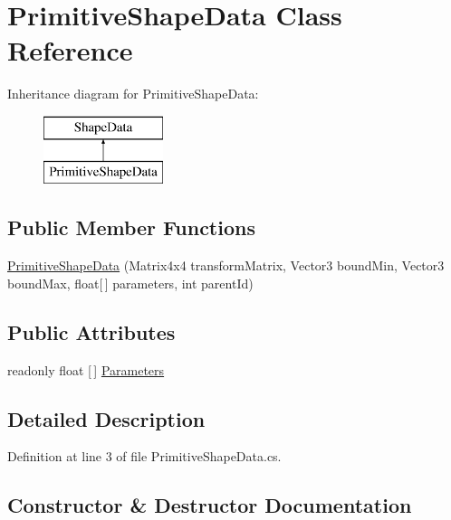 \hypertarget{class_primitive_shape_data}{}\section{Primitive\+Shape\+Data Class Reference}
\label{class_primitive_shape_data}
Inheritance diagram for Primitive\+Shape\+Data\+:\begin{figure}[H]
\begin{center}
\leavevmode
\includegraphics[height=2.000000cm]{class_primitive_shape_data}
\end{center}
\end{figure}
\subsection*{Public Member Functions}
\begin{DoxyCompactItemize}
\item 
\mbox{\hyperlink{class_primitive_shape_data_a9edf451a799cf5abe5079669cc0564b4}{Primitive\+Shape\+Data}} (Matrix4x4 transform\+Matrix, Vector3 bound\+Min, Vector3 bound\+Max, float\mbox{[}$\,$\mbox{]} parameters, int parent\+Id)
\end{DoxyCompactItemize}
\subsection*{Public Attributes}
\begin{DoxyCompactItemize}
\item 
readonly float \mbox{[}$\,$\mbox{]} \mbox{\hyperlink{class_primitive_shape_data_a707cc26c1812c832d26605d848e5c3e4}{Parameters}}
\end{DoxyCompactItemize}


\subsection{Detailed Description}


Definition at line 3 of file Primitive\+Shape\+Data.\+cs.



\subsection{Constructor \& Destructor Documentation}
\mbox{\label{class_primitive_shape_data_a9edf451a799cf5abe5079669cc0564b4}} 
